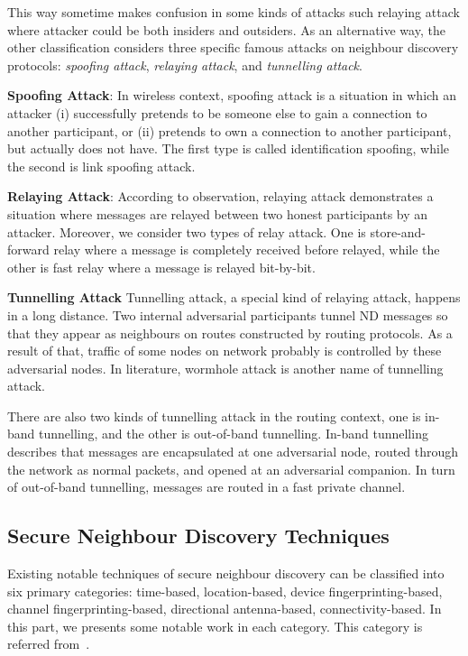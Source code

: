This way sometime makes confusion in some kinds of attacks such relaying attack where attacker could be both insiders and outsiders. As an alternative way, the other classification considers three specific famous attacks on neighbour discovery protocols: \emph{spoofing attack}, \emph{relaying attack}, and \emph{tunnelling attack}.

\textbf{Spoofing Attack}: In wireless context, spoofing attack is a situation in which an attacker (i) successfully pretends to be someone else to gain a connection to another participant, or (ii) pretends to own a connection to another participant, but actually does not have. The first type is called identification spoofing, while the second is link spoofing attack. 

\textbf{Relaying Attack}: According to observation, relaying attack demonstrates a situation where messages are relayed between two honest participants by an attacker. Moreover, we consider two types of relay attack. One is store-and-forward relay where a message is completely received before relayed, while the other is fast relay where a message is relayed bit-by-bit. 

\textbf{Tunnelling Attack} Tunnelling attack, a special kind of relaying attack, happens in a long distance. Two internal adversarial participants tunnel ND messages so that they appear as neighbours on routes constructed by routing protocols. As a result of that, traffic of some nodes on network probably is controlled by these adversarial nodes. In literature, wormhole attack is another name of tunnelling attack. 

There are also two kinds of tunnelling attack in the routing context, one is in-band tunnelling, and the other is out-of-band tunnelling. In-band tunnelling describes that messages are encapsulated at one adversarial node, routed through the network as normal packets, and opened at an adversarial companion. In turn of out-of-band tunnelling, messages are routed in a fast private channel.

\subsection{Secure Neighbour Discovery Techniques}

Existing notable techniques of secure neighbour discovery can be classified into six primary categories: time-based, location-based, device fingerprinting-based, channel fingerprinting-based, directional antenna-based, connectivity-based. In this part, we presents some notable work in each category. This category is referred from~\cite{PanosPapadimitratos}.

